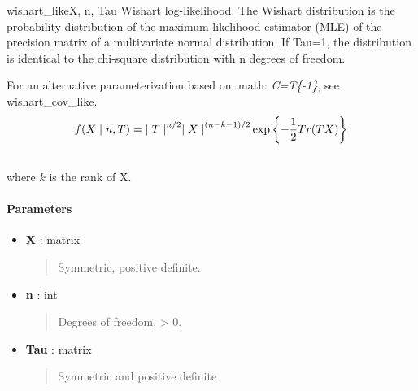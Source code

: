 \hypertarget{pymc.distributions.wishart_like}{}\begin{funcdesc}{wishart\_like}{X, n, Tau}
Wishart log-likelihood. The Wishart distribution is the probability
distribution of the maximum-likelihood estimator (MLE) of the precision
matrix of a multivariate normal distribution. If Tau=1, the distribution
is identical to the chi-square distribution with n degrees of freedom.

For an alternative parameterization based on :math: \emph{C=T\{-1\}}, see 
wishart\_cov\_like.
\begin{gather}
\begin{split}f(X \mid n, T) = {\mid T \mid}^{n/2}{\mid X \mid}^{(n-k-1)/2} \exp\left\{ -\frac{1}{2} Tr(TX) \right\}\end{split}\notag\\\begin{split}\end{split}\notag
\end{gather}
where $k$ is the rank of X.
\paragraph{Parameters}\begin{itemize}

\item[] \textbf{X} : matrix
\begin{quote}

Symmetric, positive definite.
\end{quote}

\item[] \textbf{n} : int
\begin{quote}

Degrees of freedom, \textgreater{} 0.
\end{quote}

\item[] \textbf{Tau} : matrix
\begin{quote}

Symmetric and positive definite
\end{quote}
\end{itemize}
\end{funcdesc}

